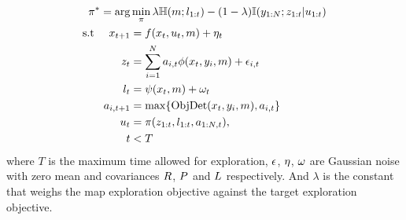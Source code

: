 %
\begin{equation}
\begin{aligned}
\policy^* = \arg &\min_{\policy} 
\lambda \En(\map; \lidar_{1:t})
- (1-\lambda) \MI(\tgt_{1:N}; \rssi_{1:t}| \ctrl_{1:t}) 
  \\
  \text{s.t } \quad
  \pose_{t+1} &= \dyn(\pose_t, \ctrl_t, \map) + \pnoise_t
  \\
  \rssi_{t} &= \sum_{i=1}^N \act_{i,t} \RSSIModel(\pose_t, \tgt_i, \map) + \rnoise_{i,t}
  \\
  \lidar_{t} &= \LidarModel(\pose_t, \map) + \lnoise_t
  \\
  \act_{i,t+1} &=  \max\{\AlgObjDet(\pose_t, \tgt_i, \map), \act_{i,t} \}
  \\
  \ctrl_t &= \policy(\rssi_{1:t}, \lidar_{1:t}, \act_{1:N,t}),
  \\
  t &< T
\end{aligned}%
\end{equation}
% 
where $T$ is the maximum time allowed for exploration, $\epsilon$, $\eta$,
$\omega$ are Gaussian noise with zero mean and covariances $R$, $P$ and
$L$ respectively.
And $\lambda$ is the
constant that weighs the map exploration objective against the target
exploration objective.
